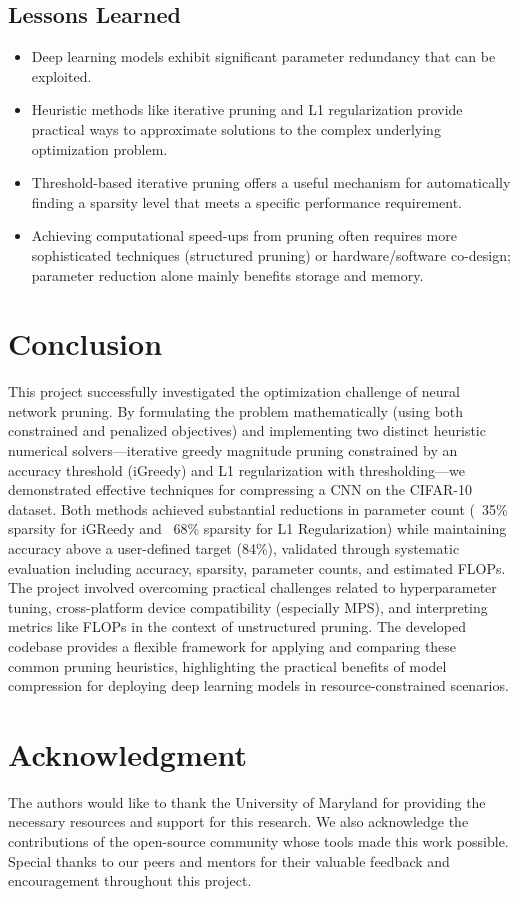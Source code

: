 \documentclass[conference]{IEEEtran} %
\begin{document}
\subsection{Lessons Learned}
\begin{itemize}
    \item Deep learning models exhibit significant parameter redundancy that can be exploited.
    \item Heuristic methods like iterative pruning and L1 regularization provide practical ways to approximate solutions to the complex underlying optimization problem.
    \item Threshold-based iterative pruning offers a useful mechanism for automatically finding a sparsity level that meets a specific performance requirement.
    \item Achieving computational speed-ups from pruning often requires more sophisticated techniques (structured pruning) or hardware/software co-design; parameter reduction alone mainly benefits storage and memory.
\end{itemize}

\section{Conclusion}
This project successfully investigated the optimization challenge of neural network pruning. By formulating the problem mathematically (using both constrained and penalized objectives) and implementing two distinct heuristic numerical solvers—iterative greedy magnitude pruning constrained by an accuracy threshold (iGreedy) and L1 regularization with thresholding—we demonstrated effective techniques for compressing a CNN on the CIFAR-10 dataset. Both methods achieved substantial reductions in parameter count (~35\% sparsity for iGReedy and ~68\% sparsity for L1 Regularization) while maintaining accuracy above a user-defined target (84\%), validated through systematic evaluation including accuracy, sparsity, parameter counts, and estimated FLOPs. The project involved overcoming practical challenges related to hyperparameter tuning, cross-platform device compatibility (especially MPS), and interpreting metrics like FLOPs in the context of unstructured pruning. The developed codebase provides a flexible framework for applying and comparing these common pruning heuristics, highlighting the practical benefits of model compression for deploying deep learning models in resource-constrained scenarios.

\section*{Acknowledgment} %
The authors would like to thank the University of Maryland for providing the necessary resources and support for this research. We also acknowledge the contributions of the open-source community whose tools made this work possible. Special thanks to our peers and mentors for their valuable feedback and encouragement throughout this project.
\end{document}
